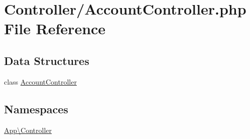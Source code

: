 \hypertarget{_account_controller_8php}{}\section{Controller/\+Account\+Controller.php File Reference}
\label{_account_controller_8php}
\subsection*{Data Structures}
\begin{DoxyCompactItemize}
\item 
class \mbox{\hyperlink{class_app_1_1_controller_1_1_account_controller}{Account\+Controller}}
\end{DoxyCompactItemize}
\subsection*{Namespaces}
\begin{DoxyCompactItemize}
\item 
 \mbox{\hyperlink{namespace_app_1_1_controller}{App\textbackslash{}\+Controller}}
\end{DoxyCompactItemize}
